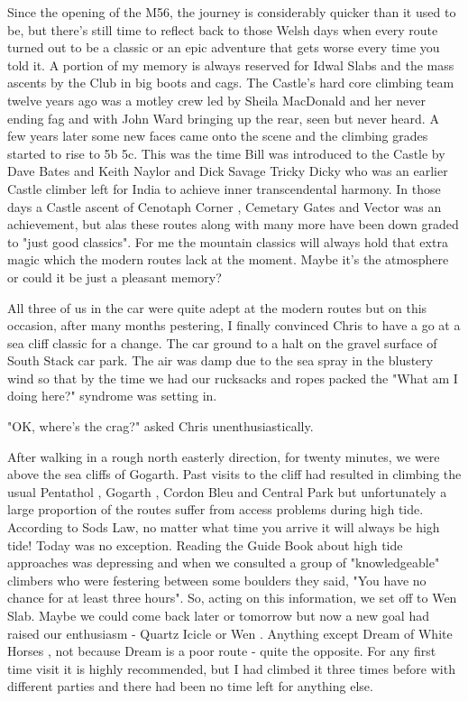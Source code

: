 \documentclass[a5paper,openany,font 10pt]{scrbook}
\begin{document}
Since the opening of the M56, the journey is considerably
quicker than it used to be, but there's still time to reflect
back to those Welsh days when every route turned out to be a
classic or an epic adventure that gets worse every time you told
it.  A portion of my memory is always reserved for Idwal Slabs
and the mass ascents by the Club in big boots and cags.  The
Castle's hard core climbing team twelve years ago was a motley
crew led by Sheila MacDonald and her never ending fag and with
John Ward bringing up the rear, seen but never heard.  A few
years later some new faces came onto the scene and the climbing
grades started to rise to 5b 5c.  This was the time Bill was
introduced to the Castle  by Dave Bates and Keith Naylor  and
Dick Savage  Tricky Dicky  who was an earlier Castle climber left
for India to achieve inner transcendental harmony.  In those days
a Castle ascent of  Cenotaph Corner ,  Cemetary Gates  and  Vector  was
an achievement, but alas these routes along with many more have
been down graded to "just good classics". For me the mountain
classics will always hold that extra magic which the modern
routes lack at the moment. Maybe it's the atmosphere or could it
be just a pleasant memory?

All three of us in the car were quite adept at the modern
routes but on this occasion, after many months pestering, I
finally convinced Chris to have a go at a sea cliff classic for a
change. The car ground to a halt on the gravel surface of South
Stack car park. The air was damp due to the sea spray in the
blustery wind so that by the time we had our rucksacks and ropes
packed the "What am I doing here?" syndrome was setting in.

"OK, where's the crag?" asked Chris unenthusiastically.

After walking in a rough north easterly direction, for
twenty minutes, we were above the sea cliffs of Gogarth. Past
visits to the cliff had resulted in climbing the usual  Pentathol ,
 Gogarth ,  Cordon Bleu  and  Central Park  but unfortunately a large
proportion of the routes suffer from access problems during high
tide.  According to Sods Law, no matter what time you arrive it
will always be high tide! Today was no exception.  Reading the
Guide Book about high tide approaches was depressing and when we
consulted a group of "knowledgeable" climbers  who were festering
between some boulders they said, "You have no chance for at least
three hours". So, acting on this information, we set off to Wen
Slab. Maybe we could come back later or tomorrow but now a new
goal had raised our enthusiasm -  Quartz Icicle  or  Wen . Anything
except  Dream of White Horses , not because  Dream  is a poor route -
quite the opposite. For any first time visit it is highly
recommended, but I had climbed it three times before with
different parties and there had been no time left for anything
else.
\end{document}
